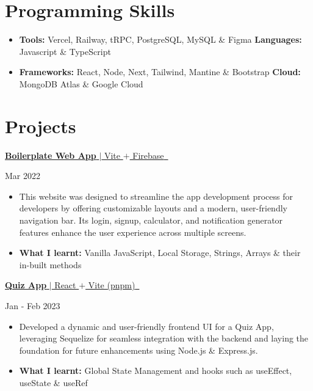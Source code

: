 \documentclass[letterpaper,11pt]{article}
\newcommand{\resumeItem}[2]{
  \item\small{
    \textbf{#1}{#2 \vspace{-2pt}}
  }
}
\newcommand{\project}[2]{
\textbf{}{
\href{#2}{{#1} \,\faExternalLink}
}
    \hfill
}
\newcommand{\projectHeading}[3]{\project{#1}{#2}
{#3}\\ \vspace{-1pt}}
\newcommand{\resumeSubHeadingListStart}{\begin{itemize}[leftmargin=*]}
\newcommand{\resumeSubHeadingListEnd}{\end{itemize}}
\newcommand{\resumeItemListStart}{\begin{itemize}}
\newcommand{\resumeItemListEnd}{\end{itemize}\vspace{-5pt}}
\begin{document}
\section{Programming Skills}
\resumeSubHeadingListStart
\item{
      \textbf{Tools: }{Vercel, Railway, tRPC, PostgreSQL, MySQL \& Figma}
      \hfill
      \textbf{Languages: }{Javascript \& TypeScript}}
\vspace{-7pt}
\item{
      \textbf{Frameworks: }{React, Node, Next, Tailwind, Mantine \& Bootstrap}
      \hfill
      \textbf{Cloud: }{MongoDB Atlas \& Google Cloud}}
\resumeSubHeadingListEnd
 
\section{Projects}
\projectHeading{\textbf{Boilerplate Web App} $|$ Vite $+$ Firebase}{https://boilerplatewebapp.vercel.app}{Mar 2022}
\vspace{-5pt}
\resumeItemListStart
\resumeItem{}{This website was designed to streamline the app development process for developers by offering customizable layouts and a modern, user-friendly navigation bar. Its login, signup, calculator, and notification generator features enhance the user experience across multiple screens.}
\vspace{-5pt}
\resumeItem{What I learnt: }{Vanilla JavaScript, Local Storage, Strings, Arrays \& their in-built methods}
\resumeItemListEnd
\vspace{4pt}
\projectHeading{\textbf{Quiz App} $|$ React $+$ Vite (pnpm)}{https://github.com/quizlabs/v0}{Jan - Feb 2023}
\vspace{-5pt}
\resumeItemListStart
\resumeItem{}{Developed a dynamic and user-friendly frontend UI for a Quiz App, leveraging Sequelize for seamless integration with the backend and laying the foundation for future enhancements using Node.js \& Express.js.}
\vspace{-5pt}
\resumeItem{What I learnt: }{Global State Management and hooks such as useEffect, useState \& useRef}
\resumeItemListEnd

\end{document}
